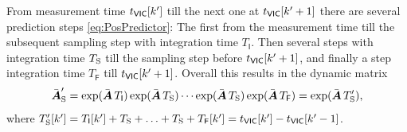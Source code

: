 From measurement time $t_{\mathsf{VIC}}[k']$ till the next one at $t_{\mathsf{VIC}}[k'+1]$ there are several prediction steps \eqref{eq:PosPredictor}:
The first from the measurement time till the subsequent sampling step with integration time $T_\mathsf{I}$.
Then several steps with integration time $T_{\mathrm{S}}$ till the sampling step before $t_{\mathsf{VIC}}[k'+1]$, and finally a step integration time $T_\mathsf{F}$ till $t_{\mathsf{VIC}}[k'+1]$.
Overall this results in the dynamic matrix 
\begin{align}
 \bar{\boldsymbol{A}}'_{\mathrm{S}} = \exp(\bar{\boldsymbol{A}}\,T_\mathsf{I}) \exp(\bar{\boldsymbol{A}}\,T_{\mathrm{S}}) \cdots \exp(\bar{\boldsymbol{A}}\,T_{\mathrm{S}}) \exp(\bar{\boldsymbol{A}}\,T_\mathsf{F}) = \exp(\bar{\boldsymbol{A}}\,T'_{\mathrm{S}}), 
\end{align}
where $T'_{\mathrm{S}}[k'] = T_\mathsf{I}[k'] + T_{\mathrm{S}} + \ldots + T_{\mathrm{S}} + T_\mathsf{F}[k'] = t_{\mathsf{VIC}}[k'] - t_{\mathsf{VIC}}[k'-1]$.

